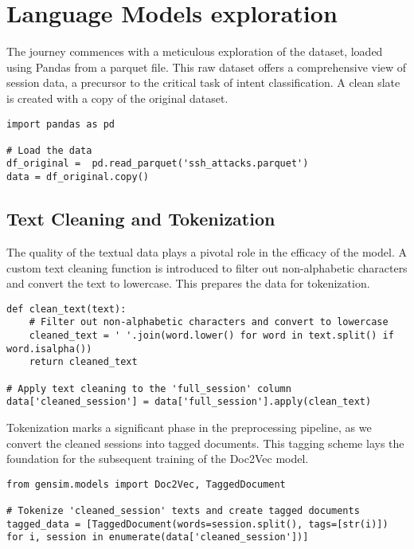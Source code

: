 \section{Language Models exploration} \label{Language Models exploration}
\hrulefill  %

The journey commences with a meticulous exploration of the dataset, loaded using Pandas from a parquet file. This raw dataset offers a comprehensive view of session data, a precursor to the critical task of intent classification. A clean slate is created with a copy of the original dataset.

\begin{lstlisting}
import pandas as pd

# Load the data
df_original =  pd.read_parquet('ssh_attacks.parquet')
data = df_original.copy()
\end{lstlisting}

\subsection{Text Cleaning and Tokenization}
The quality of the textual data plays a pivotal role in the efficacy of the model. A custom text cleaning function is introduced to filter out non-alphabetic characters and convert the text to lowercase. This prepares the data for tokenization.

\begin{lstlisting}
def clean_text(text):
    # Filter out non-alphabetic characters and convert to lowercase
    cleaned_text = ' '.join(word.lower() for word in text.split() if word.isalpha())
    return cleaned_text

# Apply text cleaning to the 'full_session' column
data['cleaned_session'] = data['full_session'].apply(clean_text)
\end{lstlisting}

Tokenization marks a significant phase in the preprocessing pipeline, as we convert the cleaned sessions into tagged documents. This tagging scheme lays the foundation for the subsequent training of the Doc2Vec model.

\begin{lstlisting}
from gensim.models import Doc2Vec, TaggedDocument

# Tokenize 'cleaned_session' texts and create tagged documents
tagged_data = [TaggedDocument(words=session.split(), tags=[str(i)]) for i, session in enumerate(data['cleaned_session'])]
\end{lstlisting}


